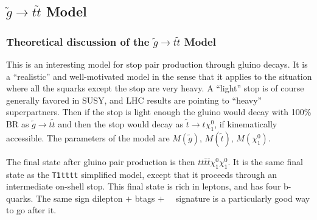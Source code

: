 


\subsection{$\widetilde{g} \to t\widetilde{t}$ Model}
\label{sec:firststopmodel}

\subsubsection{Theoretical discussion of the $\widetilde{g} \to t\widetilde{t}$ Model}
\label{sec:firststopmodeltheory}

This is an interesting model for stop pair production through gluino 
decays\cite{susyssbtags}\cite{susyssbtags2}\cite{wacker}\cite{naturalness4}.
It is a ``realistic'' and well-motivated 
model in the sense that it applies to the situation 
where all the squarks except the stop are very heavy.  A ``light'' stop is of course
generally favored in SUSY, and LHC results are pointing to ``heavy'' superpartners.
Then if the stop
is light enough the gluino would decay with 100\% BR as $\widetilde{g} \to t\widetilde{t}$
and then the stop would decay as $\widetilde{t} \to t \chi_1^0$, if kinematically 
accessible.
The parameters of the model are $M(\widetilde{g})$, $M(\widetilde{t})$, $M(\chi_1^0)$.

The final state after gluino pair production is then $tt\bar{t}\bar{t}\chi_1^0\chi_1^0$.
It is the same final state as the {\tt T1tttt} 
simplified model\cite{T1tttt}, except that 
it proceeds through an intermediate on-shell stop.  This final state is rich in leptons,
and has four b-quarks.  The same sign dilepton $+$ btags $+$ 
\met~~signature is a 
particularly good way to go after it.


